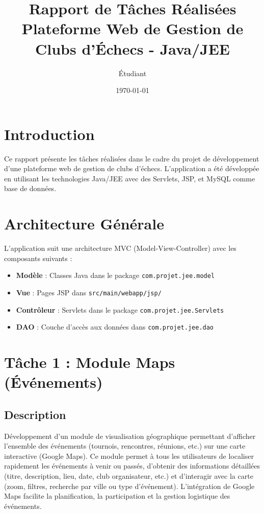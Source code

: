 \documentclass[12pt,a4paper]{article}
\title{\textbf{Rapport de Tâches Réalisées} \\ 
       \large Plateforme Web de Gestion de Clubs d'Échecs - Java/JEE}
\author{Étudiant}
\date{\today}
\begin{document}
\maketitle
\thispagestyle{fancy}

\tableofcontents
\newpage

\section{Introduction}

Ce rapport présente les tâches réalisées dans le cadre du projet de développement d'une plateforme web de gestion de clubs d'échecs. L'application a été développée en utilisant les technologies Java/JEE avec des Servlets, JSP, et MySQL comme base de données.

\section{Architecture Générale}

L'application suit une architecture MVC (Model-View-Controller) avec les composants suivants :

\begin{itemize}
    \item \textbf{Modèle} : Classes Java dans le package \texttt{com.projet.jee.model}
    \item \textbf{Vue} : Pages JSP dans \texttt{src/main/webapp/jsp/}
    \item \textbf{Contrôleur} : Servlets dans le package \texttt{com.projet.jee.Servlets}
    \item \textbf{DAO} : Couche d'accès aux données dans \texttt{com.projet.jee.dao}
\end{itemize}



\section{Tâche 1 : Module Maps (Événements)}

\subsection{Description}
Développement d'un module de visualisation géographique permettant d'afficher l'ensemble des événements (tournois, rencontres, réunions, etc.) sur une carte interactive (Google Maps). Ce module permet à tous les utilisateurs de localiser rapidement les événements à venir ou passés, d'obtenir des informations détaillées (titre, description, lieu, date, club organisateur, etc.) et d'interagir avec la carte (zoom, filtres, recherche par ville ou type d'événement). L'intégration de Google Maps facilite la planification, la participation et la gestion logistique des événements.
\end{document}
